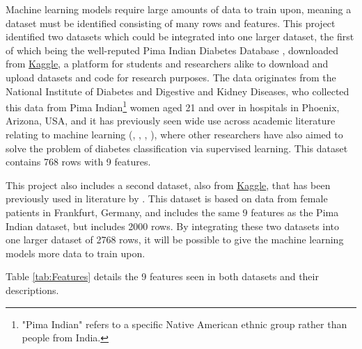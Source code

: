 \documentclass[12pt]{report}
\newcommand{\para}{\vspace{8pt}\noindent}
\begin{document}
Machine learning models require large amounts of data to train upon, meaning a dataset must be identified consisting of many 
rows and features. This project identified two datasets which could be integrated into one larger dataset, the first of which being 
the well-reputed Pima Indian Diabetes Database \autocite{uci_machine_learning_pima_nodate}, downloaded from \href{https://www.kaggle.com/datasets/uciml/pima-indians-diabetes-database}{Kaggle}, 
a platform for students and researchers alike to download and upload datasets and code for research purposes. The data originates from the National Institute 
of Diabetes and Digestive and Kidney Diseases, who collected this data from Pima Indian\footnote{"Pima Indian" refers to a specific Native American ethnic group rather than people from India.}
women aged 21 and over in hospitals in Phoenix, Arizona, USA, and it has previously seen wide use across academic literature relating to machine learning (\textcite{alzubi_diabetes_2023}, \textcite{zou_construction_2024}, \textcite{joshi_predicting_2021}, \textcite{hayashi_rule_2016}),
where other researchers have also aimed to solve the problem of diabetes classification via supervised learning. This dataset contains 768 rows with 9 features.

\para
This project also includes a second dataset, also from \href{https://www.kaggle.com/datasets/johndasilva/diabetes/data}{Kaggle}, that has been previously used in literature by 
\textcite{zou_construction_2024}. This dataset \autocite{john_dasilva_frankfurt_nodate} is based on data from female patients in Frankfurt, Germany, and includes the same 9 features as the Pima Indian dataset, but includes 2000 rows. By integrating these two datasets into one larger
dataset of 2768 rows, it will be possible to give the machine learning models more data to train upon.

\para Table \ref{tab:Features} details the 9 features seen in both datasets and their descriptions.
\end{document}
